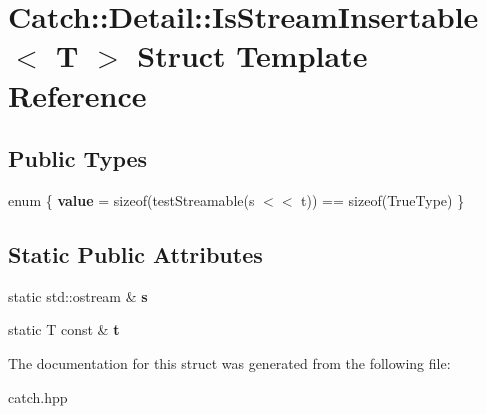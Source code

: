 \hypertarget{structCatch_1_1Detail_1_1IsStreamInsertable}{}\section{Catch\+:\+:Detail\+:\+:Is\+Stream\+Insertable$<$ T $>$ Struct Template Reference}
\label{structCatch_1_1Detail_1_1IsStreamInsertable}
\subsection*{Public Types}
\begin{DoxyCompactItemize}
\item 
\mbox{\label{structCatch_1_1Detail_1_1IsStreamInsertable_a2e4508694da3bf368ff67733a7970edd}} 
enum \{ {\bfseries value} = sizeof(test\+Streamable(s $<$$<$ t)) == sizeof(True\+Type)
 \}
\end{DoxyCompactItemize}
\subsection*{Static Public Attributes}
\begin{DoxyCompactItemize}
\item 
\mbox{\label{structCatch_1_1Detail_1_1IsStreamInsertable_abe3d3c8e5d85665747faafffc9a96b00}} 
static std\+::ostream \& {\bfseries s}
\item 
\mbox{\label{structCatch_1_1Detail_1_1IsStreamInsertable_a7d2a3da978b6736667a7b2f6d51f507f}} 
static T const  \& {\bfseries t}
\end{DoxyCompactItemize}


The documentation for this struct was generated from the following file\+:\begin{DoxyCompactItemize}
\item 
catch.\+hpp\end{DoxyCompactItemize}
